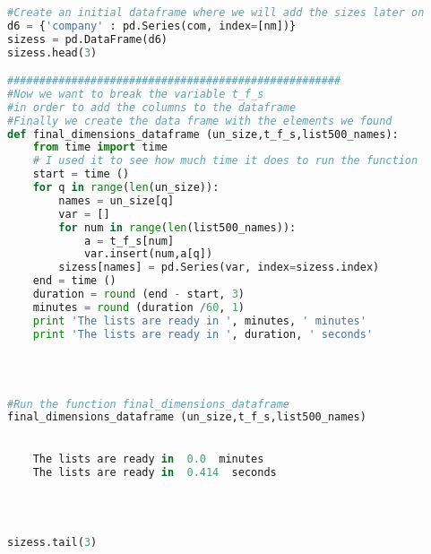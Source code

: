 \documentclass{article}
\begin{document}
\begin{lstlisting}[language=Python]
 
#Create an initial dataframe where we will add the sizes later on
d6 = {'company' : pd.Series(com, index=[nm])}
sizess = pd.DataFrame(d6)    
sizess.head(3)

####################################################
#Now we want to break the variable t_f_s 
#in order to add the columns to the dataframe                  
#Finally we create the data frame with the elements we found 
def final_dimensions_dataframe (un_size,t_f_s,list500_names):
    from time import time 
    # I used it to see how much time it does to run the function
    start = time ()
    for q in range(len(un_size)):
        names = un_size[q]
        var = []
        for num in range(len(list500_names)):
            a = t_f_s[num]
            var.insert(num,a[q])
        sizess[names] = pd.Series(var, index=sizess.index) 
    end = time ()
    duration = round (end - start, 3)
    minutes = round (duration /60, 1)
    print 'The lists are ready in ', minutes, ' minutes'
    print 'The lists are ready in ', duration, ' seconds'
 


 
#Run the function final_dimensions_dataframe
final_dimensions_dataframe (un_size,t_f_s,list500_names)
 

    The lists are ready in  0.0  minutes
    The lists are ready in  0.414  seconds
    


 
sizess.tail(3)
\end{lstlisting}
\end{document}
